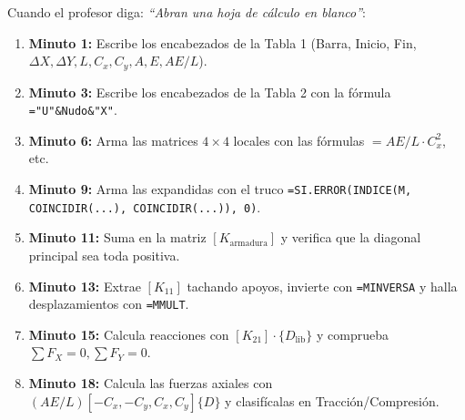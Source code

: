 \documentclass[10pt,a4paper]{article}
\begin{document}
\vspace{0.4cm}
\begin{pedagcard}
Cuando el profesor diga: \textit{``Abran una hoja de cálculo en blanco''}:
\begin{enumerate}
    \item \textbf{Minuto 1:} Escribe los encabezados de la Tabla 1 (Barra, Inicio, Fin, $\Delta X, \Delta Y, L, C_x, C_y, A, E, AE/L$).
    \item \textbf{Minuto 3:} Escribe los encabezados de la Tabla 2 con la fórmula \texttt{="U"\&Nudo\&"X"}.
    \item \textbf{Minuto 6:} Arma las matrices $4\times 4$ locales con las fórmulas $=AE/L \cdot C_x^2$, etc.
    \item \textbf{Minuto 9:} Arma las expandidas con el truco \texttt{=SI.ERROR(INDICE(M, COINCIDIR(...), COINCIDIR(...)), 0)}.
    \item \textbf{Minuto 11:} Suma en la matriz $[K_{\text{armadura}}]$ y verifica que la diagonal principal sea toda positiva.
    \item \textbf{Minuto 13:} Extrae $[K_{11}]$ tachando apoyos, invierte con \texttt{=MINVERSA} y halla desplazamientos con \texttt{=MMULT}.
    \item \textbf{Minuto 15:} Calcula reacciones con $[K_{21}] \cdot \{D_{\text{lib}}\}$ y comprueba $\sum F_X = 0, \sum F_Y = 0$.
    \item \textbf{Minuto 18:} Calcula las fuerzas axiales con $(AE/L)[-C_x, -C_y, C_x, C_y]\{D\}$ y clasifícalas en Tracción/Compresión.
\end{enumerate}
\end{pedagcard}
\end{document}
